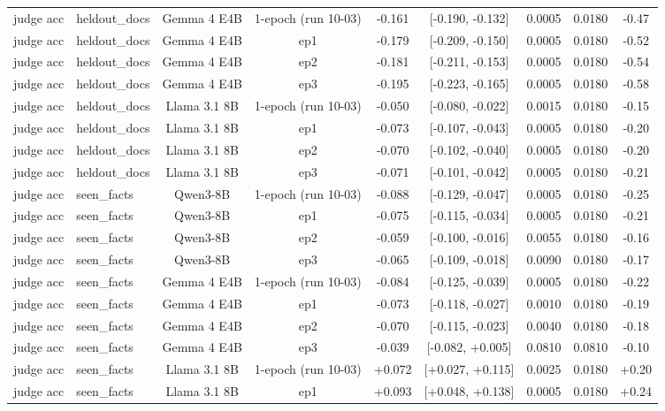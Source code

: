 \begin{table}[t]
{\begin{tabular}{llccccccc}
judge acc & heldout\_docs & Gemma 4 E4B & 1-epoch (run 10-03) & -0.161 & [-0.190, -0.132] & 0.0005 & 0.0180 & -0.47 \\
judge acc & heldout\_docs & Gemma 4 E4B & ep1 & -0.179 & [-0.209, -0.150] & 0.0005 & 0.0180 & -0.52 \\
judge acc & heldout\_docs & Gemma 4 E4B & ep2 & -0.181 & [-0.211, -0.153] & 0.0005 & 0.0180 & -0.54 \\
judge acc & heldout\_docs & Gemma 4 E4B & ep3 & -0.195 & [-0.223, -0.165] & 0.0005 & 0.0180 & -0.58 \\
judge acc & heldout\_docs & Llama 3.1 8B & 1-epoch (run 10-03) & -0.050 & [-0.080, -0.022] & 0.0015 & 0.0180 & -0.15 \\
judge acc & heldout\_docs & Llama 3.1 8B & ep1 & -0.073 & [-0.107, -0.043] & 0.0005 & 0.0180 & -0.20 \\
judge acc & heldout\_docs & Llama 3.1 8B & ep2 & -0.070 & [-0.102, -0.040] & 0.0005 & 0.0180 & -0.20 \\
judge acc & heldout\_docs & Llama 3.1 8B & ep3 & -0.071 & [-0.101, -0.042] & 0.0005 & 0.0180 & -0.21 \\
judge acc & seen\_facts & Qwen3-8B & 1-epoch (run 10-03) & -0.088 & [-0.129, -0.047] & 0.0005 & 0.0180 & -0.25 \\
judge acc & seen\_facts & Qwen3-8B & ep1 & -0.075 & [-0.115, -0.034] & 0.0005 & 0.0180 & -0.21 \\
judge acc & seen\_facts & Qwen3-8B & ep2 & -0.059 & [-0.100, -0.016] & 0.0055 & 0.0180 & -0.16 \\
judge acc & seen\_facts & Qwen3-8B & ep3 & -0.065 & [-0.109, -0.018] & 0.0090 & 0.0180 & -0.17 \\
judge acc & seen\_facts & Gemma 4 E4B & 1-epoch (run 10-03) & -0.084 & [-0.125, -0.039] & 0.0005 & 0.0180 & -0.22 \\
judge acc & seen\_facts & Gemma 4 E4B & ep1 & -0.073 & [-0.118, -0.027] & 0.0010 & 0.0180 & -0.19 \\
judge acc & seen\_facts & Gemma 4 E4B & ep2 & -0.070 & [-0.115, -0.023] & 0.0040 & 0.0180 & -0.18 \\
judge acc & seen\_facts & Gemma 4 E4B & ep3 & -0.039 & [-0.082, +0.005] & 0.0810 & 0.0810 & -0.10 \\
judge acc & seen\_facts & Llama 3.1 8B & 1-epoch (run 10-03) & +0.072 & [+0.027, +0.115] & 0.0025 & 0.0180 & +0.20 \\
judge acc & seen\_facts & Llama 3.1 8B & ep1 & +0.093 & [+0.048, +0.138] & 0.0005 & 0.0180 & +0.24 \\

\end{tabular}}
\end{table}
